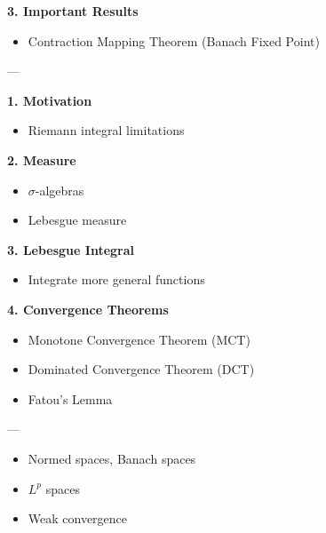 \documentclass[12pt,a4paper]{report}
\begin{document}
\begin{description}
\begin{description}
    \item \textbf{3. Important Results}

		\begin{itemize}
        \item Contraction Mapping Theorem (Banach Fixed Point)
		\end{itemize}

	\end{description}
---

\item {}

	\begin{description}
    \item \textbf{1. Motivation}

		\begin{itemize}
        \item Riemann integral limitations
		\end{itemize}

    \item \textbf{2. Measure}

		\begin{itemize}
        \item $\sigma$-algebras
        \item Lebesgue measure
		\end{itemize}

    \item \textbf{3. Lebesgue Integral}

		\begin{itemize}
        \item Integrate more general functions
		\end{itemize}

    \item \textbf{4. Convergence Theorems}

		\begin{itemize}
        \item Monotone Convergence Theorem (MCT)
        \item Dominated Convergence Theorem (DCT)
        \item Fatou’s Lemma
		\end{itemize}

	\end{description}
---

\item {}

		\begin{itemize}
        \item Normed spaces, Banach spaces
        \item $L^p$ spaces
        \item Weak convergence
		\end{itemize}


\end{description}
\end{document}
